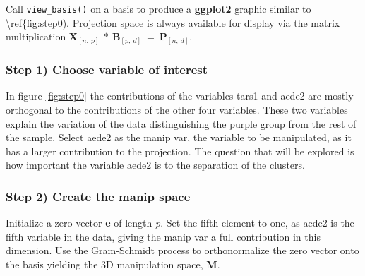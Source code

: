 Call \texttt{view\_basis()} on a basis to produce a \textbf{ggplot2}
graphic similar to \textbackslash ref\{fig:step0). Projection space is
always available for display via the matrix multiplication
\(\textbf{X}_{[n,~p]} ~*~ \textbf{B}_{[p,~d]} ~=~ \textbf{P}_{[n,~d]}\).

\begin{Schunk}
\end{Schunk}

\hypertarget{step-1-choose-variable-of-interest}{%
\subsubsection{Step 1) Choose variable of
interest}\label{step-1-choose-variable-of-interest}}

In figure \ref{fig:step0} the contributions of the variables tars1 and
aede2 are mostly orthogonal to the contributions of the other four
variables. These two variables explain the variation of the data
distinguishing the purple group from the rest of the sample. Select
aede2 as the manip var, the variable to be manipulated, as it has a
larger contribution to the projection. The question that will be
explored is how important the variable aede2 is to the separation of the
clusters.

\hypertarget{step-2-create-the-manip-space}{%
\subsubsection{Step 2) Create the manip
space}\label{step-2-create-the-manip-space}}

Initialize a zero vector \textbf{e} of length \emph{p}. Set the fifth
element to one, as aede2 is the fifth variable in the data, giving the
manip var a full contribution in this dimension. Use the Gram-Schmidt
process to orthonormalize the zero vector onto the basis yielding the 3D
manipulation space, \textbf{M}.

